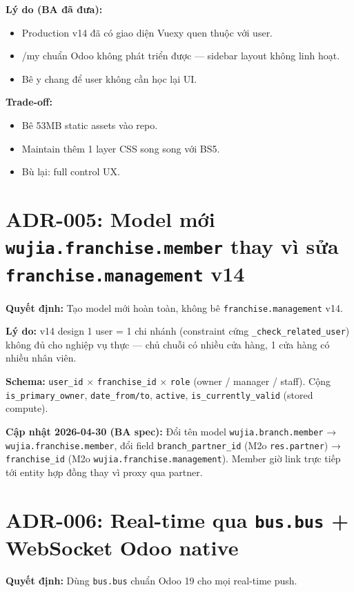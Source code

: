 \textbf{Lý do (BA đã đưa):}
\begin{itemize}
    \item Production v14 đã có giao diện Vuexy quen thuộc với user.
    \item /my chuẩn Odoo không phát triển được — sidebar layout không linh hoạt.
    \item Bê y chang để user không cần học lại UI.
\end{itemize}

\textbf{Trade-off:}
\begin{itemize}
    \item Bê 53MB static assets vào repo.
    \item Maintain thêm 1 layer CSS song song với BS5.
    \item Bù lại: full control UX.
\end{itemize}

\section{ADR-005: Model mới \texttt{wujia.franchise.member} thay vì sửa \texttt{franchise.management} v14}

\textbf{Quyết định:} Tạo model mới hoàn toàn, không bê \texttt{franchise.management} v14.

\textbf{Lý do:} v14 design 1 user = 1 chi nhánh (constraint cứng \texttt{\_check\_related\_user}) không đủ cho nghiệp vụ thực --- chủ chuỗi có nhiều cửa hàng, 1 cửa hàng có nhiều nhân viên.

\textbf{Schema:} \texttt{user\_id} × \texttt{franchise\_id} × \texttt{role} (owner / manager / staff). Cộng \texttt{is\_primary\_owner}, \texttt{date\_from/to}, \texttt{active}, \texttt{is\_currently\_valid} (stored compute).

\textbf{Cập nhật 2026-04-30 (BA spec):} Đổi tên model \texttt{wujia.branch.member} → \texttt{wujia.franchise.member}, đổi field \texttt{branch\_partner\_id} (M2o \texttt{res.partner}) → \texttt{franchise\_id} (M2o \texttt{wujia.franchise.management}). Member giờ link trực tiếp tới entity hợp đồng thay vì proxy qua partner.

\section{ADR-006: Real-time qua \texttt{bus.bus} + WebSocket Odoo native}

\textbf{Quyết định:} Dùng \texttt{bus.bus} chuẩn Odoo 19 cho mọi real-time push.

